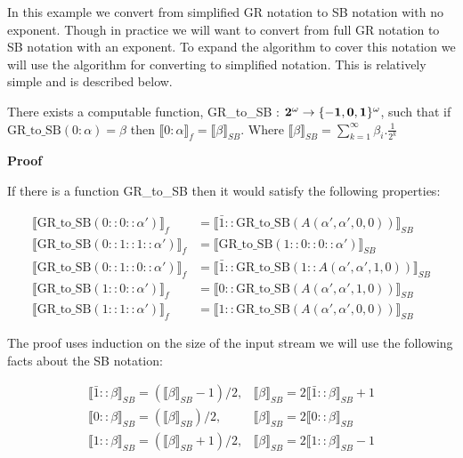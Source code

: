 \documentclass{cs4rep}
\begin{document}
In this example we convert from simplified GR notation to SB notation
with no exponent. Though in practice we will want to convert from full
GR notation to SB notation with an exponent. To expand the algorithm
to cover this notation we will use the algorithm for converting to
simplified notation. This is relatively simple and is described below.

\begin{myprop}
  There exists a computable function, GR\_to\_SB : ${\bf 2^{\omega}
    \rightarrow \{-1,0,1\}^{\omega}}$, such that if
  $\mbox{GR\_to\_SB}(0:\alpha) = \beta$ then $\llbracket 0:\alpha
  \rrbracket_{f} = \llbracket \beta \rrbracket_{SB}$. Where
  $\llbracket \beta \rrbracket_{SB} = \sum^{\infty}_{k=1} \beta_{i} .
  \frac{1}{2^k}$
\end{myprop}
{\bf Proof}

If there is a function GR\_to\_SB then it would satisfy the following properties:

\[ \begin{array}{ll}
\llbracket \mbox{GR\_to\_SB}(0::0::\alpha') \rrbracket_{f} & = \llbracket \bar{1} :: \mbox{GR\_to\_SB}(A(\alpha',\alpha',0,0)) \rrbracket_{SB} \\
\llbracket \mbox{GR\_to\_SB}(0::1::1::\alpha') \rrbracket_{f} & = \llbracket \mbox{GR\_to\_SB}(1::0::0::\alpha') \rrbracket_{SB} \\
\llbracket \mbox{GR\_to\_SB}(0::1::0::\alpha') \rrbracket_{f} & = \llbracket \bar{1} :: \mbox{GR\_to\_SB}(1::A(\alpha',\alpha',1,0)) \rrbracket_{SB} \\
\llbracket \mbox{GR\_to\_SB}(1::0::\alpha') \rrbracket_{f} & = \llbracket 0 :: \mbox{GR\_to\_SB}(A(\alpha',\alpha',1,0)) \rrbracket_{SB} \\
\llbracket \mbox{GR\_to\_SB}(1::1::\alpha') \rrbracket_{f} & = \llbracket 1 :: \mbox{GR\_to\_SB}(A(\alpha',\alpha',0,0)) \rrbracket_{SB}
\end{array} \]

The proof uses induction on the size of the input stream we will use
the following facts about the SB notation:

\[ \begin{array}{ll}
\llbracket \bar{1} :: \beta \rrbracket_{SB} = (\llbracket \beta \rrbracket_{SB} - 1) / 2, & \llbracket \beta \rrbracket_{SB} = 2 \llbracket \bar{1} :: \beta \rrbracket_{SB} + 1 \\
\llbracket 0 :: \beta \rrbracket_{SB} = (\llbracket \beta \rrbracket_{SB}) / 2, & \llbracket \beta \rrbracket_{SB} = 2 \llbracket 0 :: \beta \rrbracket_{SB} \\
\llbracket 1 :: \beta \rrbracket_{SB} = (\llbracket \beta \rrbracket_{SB} + 1) / 2, & \llbracket \beta \rrbracket_{SB} = 2 \llbracket 1 :: \beta \rrbracket_{SB} - 1
\end{array} \]
\end{document}
